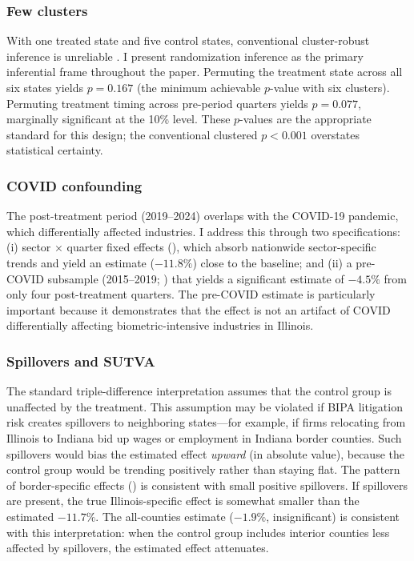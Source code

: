 \documentclass[12pt]{article}
\begin{document}
\subsubsection*{Few clusters} With one treated state and five control states, conventional cluster-robust inference is unreliable \citep{cameron2008}. I present randomization inference as the primary inferential frame throughout the paper. Permuting the treatment state across all six states yields $p = 0.167$ (the minimum achievable $p$-value with six clusters). Permuting treatment timing across pre-period quarters yields $p = 0.077$, marginally significant at the 10\% level. These $p$-values are the appropriate standard for this design; the conventional clustered $p < 0.001$ overstates statistical certainty.

\subsubsection*{COVID confounding} The post-treatment period (2019--2024) overlaps with the COVID-19 pandemic, which differentially affected industries. I address this through two specifications: (i) sector $\times$ quarter fixed effects (), which absorb nationwide sector-specific trends and yield an estimate ($-11.8\%$) close to the baseline; and (ii) a pre-COVID subsample (2015--2019; ) that yields a significant estimate of $-4.5\%$ from only four post-treatment quarters. The pre-COVID estimate is particularly important because it demonstrates that the effect is not an artifact of COVID differentially affecting biometric-intensive industries in Illinois.

\subsubsection*{Spillovers and SUTVA} The standard triple-difference interpretation assumes that the control group is unaffected by the treatment. This assumption may be violated if BIPA litigation risk creates spillovers to neighboring states---for example, if firms relocating from Illinois to Indiana bid up wages or employment in Indiana border counties. Such spillovers would bias the estimated effect \textit{upward} (in absolute value), because the control group would be trending positively rather than staying flat. The pattern of border-specific effects () is consistent with small positive spillovers. If spillovers are present, the true Illinois-specific effect is somewhat smaller than the estimated $-11.7\%$. The all-counties estimate ($-1.9\%$, insignificant) is consistent with this interpretation: when the control group includes interior counties less affected by spillovers, the estimated effect attenuates.
\end{document}
